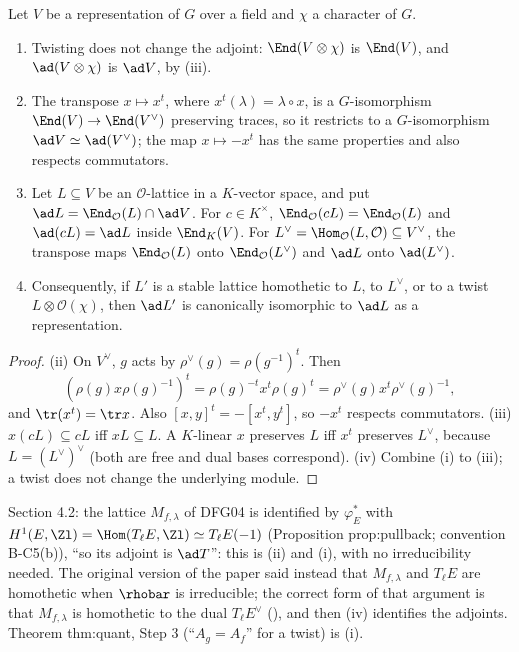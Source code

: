 \begin{proposition}\label{prop:reps:adjoint-invariance}
Let $V$ be a representation of $G$ over a field and $\chi$ a character of $G$.
\begin{enumerate}[label=(\roman*)]
\item Twisting does not change the adjoint: $\End(V\otimes\chi)$ is $\End(V)$, and $\ad(V\otimes\chi)$ is $\ad V$, by
(iii).
\item The transpose $x\mapsto x^t$, where $x^t(\lambda)=\lambda\circ x$, is a $G$-isomorphism $\End(V)\to\End(V^\vee)$ preserving traces, so it restricts to a
$G$-isomorphism $\ad V\simeq\ad(V^\vee)$; the map $x\mapsto-x^t$ has the same properties and also respects commutators.
\item Let $L\subseteq V$ be an $\mathcal{O}$-lattice in a $K$-vector space, and put $\ad L=\End_\mathcal{O}(L)\cap\ad V$. For $c\in K^\times$, $\End_\mathcal{O}(cL)=\End_\mathcal{O}(L)$ and
$\ad(cL)=\ad L$ inside $\End_K(V)$. For $L^\vee=\Hom_\mathcal{O}(L,\mathcal{O})\subseteq V^\vee$, the transpose maps $\End_\mathcal{O}(L)$ onto $\End_\mathcal{O}(L^\vee)$ and $\ad L$ onto
$\ad(L^\vee)$.
\item Consequently, if $L'$ is a stable lattice homothetic to $L$, to $L^\vee$, or to a twist $L\otimes\mathcal{O}(\chi)$, then $\ad L'$ is canonically isomorphic to
$\ad L$ as a representation.
\end{enumerate}
\end{proposition}

\begin{proof}
(ii) On $V^\vee$, $g$ acts by $\rho^\vee(g)=\rho(g^{-1})^t$. Then
\[
(\rho(g)x\rho(g)^{-1})^t=\rho(g)^{-t}x^t\rho(g)^t=\rho^\vee(g)x^t\rho^\vee(g)^{-1},
\]
and $\tr(x^t)=\tr x$.
Also $[x,y]^t=-[x^t,y^t]$, so $-x^t$ respects commutators. (iii) $x(cL)\subseteq cL$ iff $xL\subseteq L$. A $K$-linear $x$ preserves $L$ iff $x^t$ preserves
$L^\vee$, because $L=(L^\vee)^\vee$ (both are free and dual bases correspond). (iv) Combine (i) to (iii); a twist does not change the
underlying module.
\end{proof}

\begin{paperlink}
Section 4.2: the lattice $M_{f,\lambda}$ of DFG04 is identified by $\varphi_E^*$ with $H^1(E,\Zl)=\Hom(T_\ell E,\Zl)\simeq T_\ell E(-1)$ (Proposition prop:pullback;
convention B-C5(b)), ``so its adjoint is $\ad T$'': this is (ii) and (i), with no irreducibility needed. The original version of the paper
said instead that $M_{f,\lambda}$ and $T_\ell E$ are homothetic when $\rhobar$ is irreducible; the correct form of that argument is that
$M_{f,\lambda}$ is homothetic to the dual $T_\ell E^\vee$ (), and then (iv) identifies the adjoints. Theorem thm:quant,
Step 3 (``$A_g=A_f$'' for a twist) is (i).
\end{paperlink}

